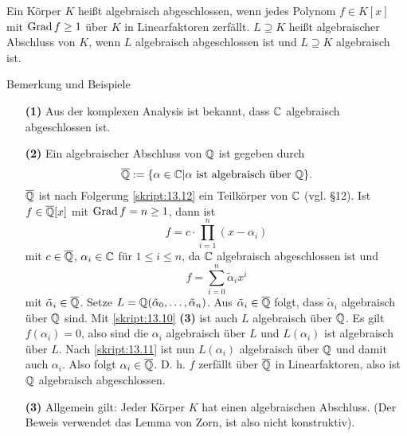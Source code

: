 \begin{df}\label{skript:13.17}
	Ein Körper $K$ heißt algebraisch abgeschlossen, wenn jedes Polynom $f\in K[x]$ mit $\operatorname{Grad} f\geq 1$ über $K$ in Linearfaktoren zerfällt. $L\supseteq K$ heißt algebraischer Abschluss von $K$, wenn $L$ algebraisch abgeschlossen ist und $L\supseteq K$ algebraisch ist.
\end{df}

\begin{genericdf}{Bemerkung und Beispiele}\label{skript:13.18}\
	\begin{enumerate}
		\item[\textbf{(1)}]
		Aus der komplexen Analysis ist bekannt, dass $\mathbb{C}$ algebraisch abgeschlossen ist.
		\item[\textbf{(2)}]
		Ein algebraischer Abschluss von $\mathbb{Q}$ ist gegeben durch
		\[\overline{\mathbb{Q}}:=\{\alpha\in\mathbb{C}|\alpha\text{ ist algebraisch über }\mathbb{Q}\}.\]
		$\overline{\mathbb{Q}}$ ist nach Folgerung \ref{skript:13.12} ein Teilkörper von $\mathbb{C}$ (vgl. §12). Ist $f\in\overline{\mathbb{Q}}[x]$ mit $\operatorname{Grad} f=n\geq 1$, dann ist
		\[f=c\cdot\prod_{i=1}^n (x-\alpha_i)\]
		mit $c\in\overline{\mathbb{Q}}$, $\alpha_i\in\mathbb{C}$ für $1\leq i\leq n$, da $\mathbb{C}$ algebraisch abgeschlossen ist und
		\[f=\sum_{i=0}^n\tilde{\alpha}_ix^i\]
		mit $\tilde{\alpha}_i\in\overline{\mathbb{Q}}$. Setze $L=\mathbb{Q}(\tilde{\alpha}_0,\ldots,\tilde{\alpha}_n)$. Aus $\tilde{\alpha}_i\in\overline{\mathbb{Q}}$ folgt, dass $\tilde{\alpha}_i$ algebraisch über $\mathbb{Q}$ sind. Mit \ref{skript:13.10} \textbf{(3)} ist auch $L$ algebraisch über $\mathbb{Q}$. Es gilt $f(\alpha_i)=0$, also sind die $\alpha_i$ algebraisch über $L$ und $L(\alpha_i)$ ist algebraisch über $L$. Nach \ref{skript:13.11} ist nun $L(\alpha_i)$ algebraisch über $\mathbb{Q}$ und damit auch $\alpha_i$. Also folgt $\alpha_i\in\overline{\mathbb{Q}}$. D. h. $f$ zerfällt über $\overline{\mathbb{Q}}$ in Linearfaktoren, also ist $\mathbb{Q}$ algebraisch abgeschlossen.
		\item[\textbf{(3)}]
		Allgemein gilt: Jeder Körper $K$ hat einen algebraischen Abschluss. (Der Beweis verwendet das Lemma von Zorn, ist also nicht konstruktiv).
	\end{enumerate}
\end{genericdf}